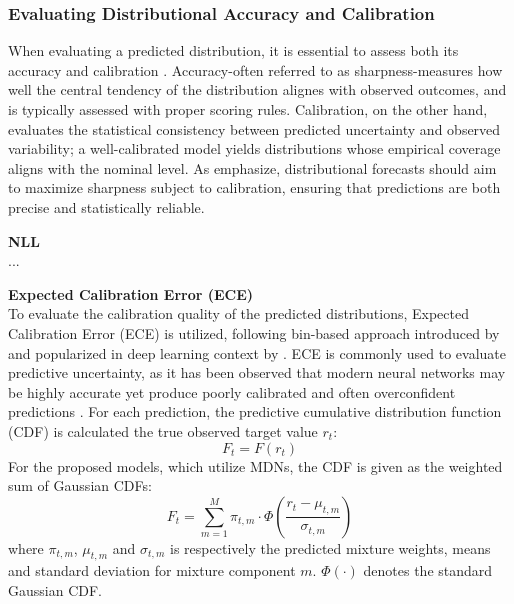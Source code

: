 \subsubsection{Evaluating Distributional Accuracy and Calibration} 
When evaluating a predicted distribution, it is essential to assess both its accuracy and calibration \parencite{Gneiting2007}. Accuracy-often referred to as sharpness-measures how well the central tendency of the distribution alignes with observed outcomes, and is typically assessed with proper scoring rules. Calibration, on the other hand, evaluates the statistical consistency between predicted uncertainty and observed variability; a well-calibrated model yields distributions whose empirical coverage aligns with the nominal level. As \textcite{Gneiting2007} emphasize, distributional forecasts should aim to maximize sharpness subject to calibration, ensuring that predictions are both precise and statistically reliable.

\textbf{NLL} \\
...


\textbf{Expected Calibration Error (ECE)} \\
To evaluate the calibration quality of the predicted distributions, Expected Calibration Error (ECE) is utilized, following bin-based approach introduced by \textcite{naeini2015} and popularized in deep learning context by \textcite{guo2017}. ECE is commonly used to evaluate predictive uncertainty, as it has been observed that modern neural networks may be highly accurate yet produce poorly calibrated and often overconfident predictions \parencite{guo2017, Nixon2017}. For each prediction, the predictive cumulative distribution function (CDF) is calculated the true observed target value $r_t$:
\begin{equation}
    F_t = F(r_t)
\end{equation}
For the proposed models, which utilize MDNs, the CDF is given as the weighted sum of Gaussian CDFs:
\begin{equation}
    F_t = \sum_{m=1}^{M} \pi_{t,m} \cdot \Phi\left( \frac{r_t - \mu_{t,m}}{\sigma_{t,m}} \right)
\end{equation}
where $\pi_{t,m}$, $\mu_{t,m}$ and $\sigma_{t,m}$ is respectively the predicted mixture weights, means and standard deviation for mixture component $m$. $\Phi(\cdot)$ denotes the standard Gaussian CDF. 

